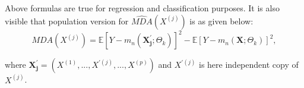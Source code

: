 Above formulas are true for regression and classification purposes. It is also visible that population version for $\widehat{MDA}( X^{(j)} )$ is as given below:
\begin{equation}
MDA( X^{(j)} ) =  \mathbb{E}[Y - m_{n}( \pmb{X^{'}_{j}};\Theta_{k})]^{2} -  \mathbb{E}[Y - m_{n}( \pmb{X};\Theta_{k})]^{2},
\end{equation}

where $ \pmb{X^{'}_{j}} = (X^{(1)},...,X^{'(j)},...,X^{(p)}) $ and $X^{'(j)}$ is here independent copy of  $X^{(j)}$. 









